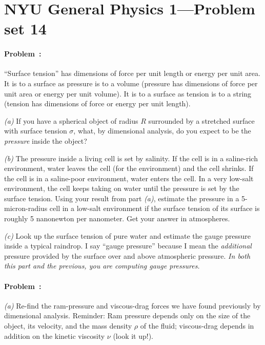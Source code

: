 \documentclass[12pt]{article}
\newcounter{problem}
\begin{document}
\thispagestyle{empty}

\section*{NYU General Physics 1---Problem set 14}

\paragraph{Problem~\theproblem:}%
``Surface tension'' has dimensions of force per unit length or energy
per unit area.  It is to a surface as pressure is to a volume
(pressure has dimensions of force per unit area or energy per unit
volume).  It is to a surface as tension is to a string (tension has
dimensions of force or energy per unit length).

\textsl{(a)} If you have a spherical object of radius $R$ surrounded
by a stretched surface with surface tension $\sigma$, what, by dimensional
analysis, do you expect to be the \emph{pressure} inside the object?

\textsl{(b)} The pressure inside a living cell is set by salinity.  If
the cell is in a saline-rich environment, water leaves the cell (for
the environment) and the cell shrinks.  If the cell is in a
saline-poor environment, water enters the cell.  In a very low-salt
environment, the cell keeps taking on water until the pressure is set
by the surface tension.  Using your result from part \textsl{(a)},
estimate the pressure in a 5-micron-radius cell in a low-salt
environment if the surface tension of its surface is roughly 5
nanonewton per nanometer.  Get your answer in atmospheres.

\textsl{(c)} Look up the surface tension of pure water and estimate
the gauge pressure inside a typical raindrop.  I say ``gauge
pressure'' because I mean the \emph{additional} pressure provided by
the surface over and above atmospheric pressure.  \emph{In both this
  part and the previous, you are computing gauge pressures.}

\paragraph{Problem~\theproblem:}%
\textsl{(a)} Re-find the ram-pressure and viscous-drag forces we have
found previously by dimensional analysis.  Reminder: Ram pressure
depends only on the size of the object, its velocity, and the mass
density $\rho$ of the fluid; viscous-drag depends in addition on the
kinetic viscosity $\nu$ (look it up!).
\end{document}
